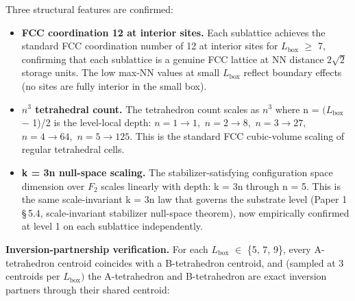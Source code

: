 \documentclass[11pt,oneside]{report}
\theoremstyle{definition}
\theoremstyle{remark}
\begin{document}
Three structural features are confirmed:

\begin{itemize}
\item
  \textbf{FCC coordination 12 at interior sites.} Each sublattice
  achieves the standard FCC coordination number of 12 at interior sites
  for \ensuremath{L_{\mathrm{box}}} \ensuremath{\geq} 7, confirming that each sublattice is a genuine FCC
  lattice at NN distance \ensuremath{2\sqrt{2}} storage units. The low max-NN values at
  small \ensuremath{L_{\mathrm{box}}} reflect boundary effects (no sites are fully interior in
  the small box).
\end{itemize}

\begin{itemize}
\item
  \textbf{\ensuremath{n^{3}} tetrahedral count.} The tetrahedron count scales as \ensuremath{n^{3}}
  where n = \ensuremath{(L_{\mathrm{box}}} \ensuremath{-} 1)/2 is the level-local depth: \ensuremath{n=1\to 1,} \ensuremath{n=2\to 8,}
  \ensuremath{n=3\to 27,} \ensuremath{n=4\to 64,} \ensuremath{n=5\to 125.} This is the standard FCC cubic-volume scaling
  of regular tetrahedral cells.
\end{itemize}

\begin{itemize}
\item
  \textbf{k = 3n null-space scaling.} The stabilizer-satisfying
  configuration space dimension over \ensuremath{F_{2}} scales linearly with depth: k =
  3n through n = 5. This is the same scale-invariant k = 3n law that
  governs the substrate level (Paper 1 \S\,5.4, scale-invariant stabilizer
  null-space theorem), now empirically confirmed at level 1 on each
  sublattice independently.
\end{itemize}

\textbf{Inversion-partnership verification.} For each \ensuremath{L_{\mathrm{box}}} \ensuremath{\in} \{5, 7,
9\}, every A-tetrahedron centroid coincides with a B-tetrahedron
centroid, and (sampled at 3 centroids per \ensuremath{L_{\mathrm{box}})} the A-tetrahedron and
B-tetrahedron are exact inversion partners through their shared
centroid:
\end{document}
